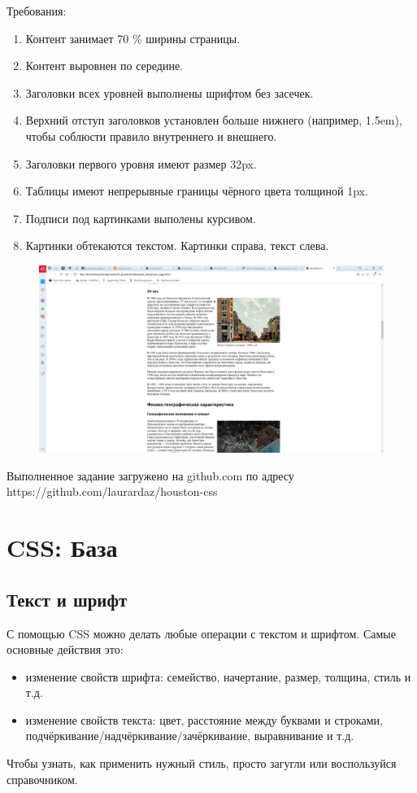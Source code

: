 \documentclass[14pt]{extreport}
\begin{document}
Требования:
\begin{enumerate}
\item Контент занимает 70 \% ширины страницы.
\item Контент выровнен по середине.
\item Заголовки всех уровней выполнены шрифтом без засечек.
\item Верхний отступ заголовков установлен больше нижнего (например, 1.5em), чтобы соблюсти правило внутреннего и внешнего.
\item Заголовки первого уровня имеют размер 32px.
\item Таблицы имеют непрерывные границы чёрного цвета толщиной 1px.
\item Подписи под картинками выполены курсивом.
\item Картинки обтекаются текстом. Картинки справа, текст слева.

\end{enumerate}
\begin{figure}[H]
\centerline{\includegraphics[width=0.8\linewidth]{pics_practice/houston2.png}}
\caption{}
\label{}
\end{figure}

Выполненное задание загружено на github.com по адресу https://github.com/laurardaz/houston-css





\chapter{CSS: База}

\section{Текст и шрифт}

С помощью CSS можно делать любые операции с текстом и шрифтом. Самые основные действия это:
\begin{itemize}
\item изменение свойств шрифта: семейство, начертание, размер, толщина, стиль и т.д.
\item изменение свойств текста: цвет, расстояние между буквами и строками, подчёркивание/надчёркивание/зачёркивание, выравнивание и т.д.
\end{itemize}
Чтобы узнать, как применить нужный стиль, просто загугли или воспользуйся справочником.
\end{document}
